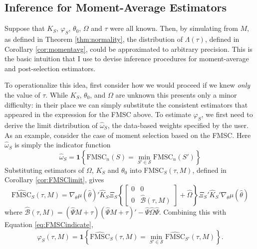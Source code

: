 \subsection{Inference for Moment-Average Estimators}
Suppose that $K_S$, $\varphi_S$, $\theta_0$, $\Omega$ and $\tau$ were all known. 
Then, by simulating from $M$, as defined in Theorem \ref{thm:normality}, the distribution of $\Lambda(\tau)$, defined in Corollary \ref{cor:momentavg}, could be approximated to arbitrary precision. 
This is the basic intuition that I use to devise inference procedures for moment-average and post-selection estimators.

To operationalize this idea, first consider how we would proceed if we knew \emph{only} the value of $\tau$.  
While $K_S$, $\theta_0$, and $\Omega$ are unknown this presents only a minor difficulty: in their place we can simply substitute the consistent estimators that appeared in the expression for the FMSC above.
To estimate $\varphi_S$, we first need to derive the limit distribution of $\widehat{\omega}_S$, the data-based weights specified by the user. 
As an example, consider the case of moment selection based on the FMSC. Here $\widehat{\omega}_S$ is simply the indicator function
\begin{equation}
	\label{eq:FMSCindicate}
	\widehat{\omega}_S = \mathbf{1}\left\{\mbox{FMSC}_n(S) = \min_{S'\in \mathscr{S}} \mbox{FMSC}_n(S')\right\}
\end{equation}
Substituting estimators of $\Omega$, $K_S$ and $\theta_0$ into $\mbox{FMSC}_S(\tau,M)$, defined in Corollary \ref{cor:FMSClimit}, gives
\begin{equation*}
	\widehat{\mbox{FMSC}}_S(\tau,M) = \nabla_\theta\mu(\widehat{\theta})'\widehat{K}_S\Xi_S \left\{\left[\begin{array}{cc}0&0\\0&\widehat{\mathcal{B}}(\tau,M) \end{array}\right] + \widehat{\Omega}\right\}\Xi_S'\widehat{K}_S'\nabla_\theta\mu(\widehat{\theta})
\end{equation*}
where $\widehat{\mathcal{B}}(\tau,M) = (\widehat{\Psi} M + \tau)(\widehat{\Psi} M + \tau)' - \widehat{\Psi} \widehat{\Omega} \widehat{\Psi}$.
Combining this with Equation \ref{eq:FMSCindicate},
\begin{equation*}
	\widehat{\varphi}_S(\tau,M) = \mathbf{1}\left\{\widehat{\mbox{FMSC}}_S(\tau,M) = \min_{S'\in \mathscr{S}} \widehat{\mbox{FMSC}}_{S'}(\tau,M)\right\}.
\end{equation*}

